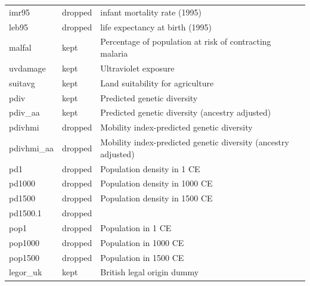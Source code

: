\begin{tabular}{lll}
 imr95                          & dropped  & infant mortality rate (1995)                                             \\
 leb95                          & dropped  & life expectancy at birth (1995)                                          \\
 malfal                         & kept     & Percentage of population at risk of contracting malaria                  \\
 uvdamage                       & kept     & Ultraviolet exposure                                                     \\
 suitavg                        & kept     & Land suitability for agriculture                                         \\
 pdiv                           & kept     & Predicted genetic diversity                                              \\
 pdiv\_aa                        & kept     & Predicted genetic diversity (ancestry adjusted)                          \\
 pdivhmi                        & dropped  & Mobility index-predicted genetic diversity                               \\
 pdivhmi\_aa                     & dropped  & Mobility index-predicted genetic diversity (ancestry adjusted)           \\
 pd1                            & dropped  & Population density in 1 CE                                               \\
 pd1000                         & dropped  & Population density in 1000 CE                                            \\
 pd1500                         & dropped  & Population density in 1500 CE                                            \\
 pd1500.1                       & dropped  &                                                                          \\
 pop1                           & dropped  & Population in 1 CE                                                       \\
 pop1000                        & dropped  & Population in 1000 CE                                                    \\
 pop1500                        & dropped  & Population in 1500 CE                                                    \\
 legor\_uk                       & kept     & British legal origin dummy                                               \\

\end{tabular}
